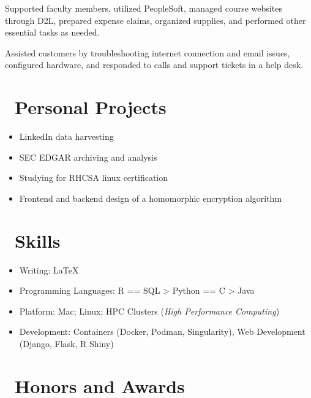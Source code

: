 \documentclass{resume}
\begin{document}
 {}
Supported faculty members, utilized PeopleSoft, managed course websites through D2L, prepared expense claims, organized supplies, and performed other essential tasks as needed. 

 {}
Assisted customers by troubleshooting internet connection and email issues, configured hardware, and responded to calls and support tickets in a help desk.


\section{\faUser\ Personal Projects}
\begin{itemize}[parsep=0.5ex]
  \item LinkedIn data harvesting
  \item SEC EDGAR archiving and analysis
  \item Studying for RHCSA linux certification 
  \item Frontend and backend design of a homomorphic encryption algorithm
\end{itemize}


\section{\faCogs\ Skills}
\begin{itemize}[parsep=0.5ex]
  \item Writing: \LaTeX
  \item Programming Languages: R == SQL > Python == C > Java
  \item Platform: Mac; Linux; HPC Clusters (\emph{High Performance Computing}) 
  \item Development: Containers (Docker, Podman, Singularity), Web Development (Django, Flask, R Shiny)
\end{itemize}


\section{\faHeartO\ Honors and Awards}
\end{document}
